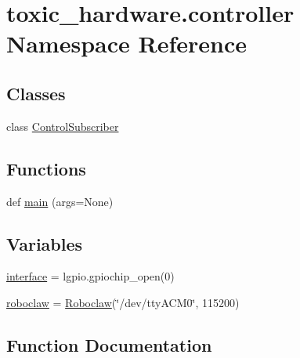 \hypertarget{namespacetoxic__hardware_1_1controller}{}\section{toxic\+\_\+hardware.\+controller Namespace Reference}
\label{namespacetoxic__hardware_1_1controller}
\subsection*{Classes}
\begin{DoxyCompactItemize}
\item 
class \mbox{\hyperlink{classtoxic__hardware_1_1controller_1_1ControlSubscriber}{Control\+Subscriber}}
\end{DoxyCompactItemize}
\subsection*{Functions}
\begin{DoxyCompactItemize}
\item 
def \mbox{\hyperlink{namespacetoxic__hardware_1_1controller_aac60e1fb14a23592e007ebec1efc50a4}{main}} (args=None)
\end{DoxyCompactItemize}
\subsection*{Variables}
\begin{DoxyCompactItemize}
\item 
\mbox{\hyperlink{namespacetoxic__hardware_1_1controller_aad059999a7b9fd3d9c1c8d089be1c11d}{interface}} = lgpio.\+gpiochip\+\_\+open(0)
\item 
\mbox{\hyperlink{namespacetoxic__hardware_1_1controller_a04dd192562404771fdbc6d100eaa3566}{roboclaw}} = \mbox{\hyperlink{classtoxic__hardware_1_1roboclaw__3_1_1Roboclaw}{Roboclaw}}(\char`\"{}/dev/tty\+A\+C\+M0\char`\"{}, 115200)
\end{DoxyCompactItemize}


\subsection{Function Documentation}
\mbox{\label{namespacetoxic__hardware_1_1controller_aac60e1fb14a23592e007ebec1efc50a4}} 
